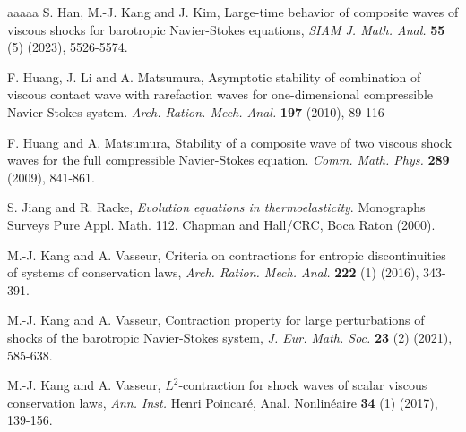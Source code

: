 \documentclass[10pt,reqno]{amsart}
\numberwithin{equation}{section}
\begin{document}
\begin{thebibliography}{aaaaa}
 S. Han, M.-J. Kang and J. Kim, Large-time behavior of composite waves of viscous shocks for barotropic Navier-Stokes equations, {\it SIAM J. Math. Anal.} {\bf  55} (5) (2023), 5526-5574.







 F. Huang, J. Li  and A. Matsumura, Asymptotic stability of combination of viscous contact wave with rarefaction waves for one-dimensional compressible Navier-Stokes system. {\it Arch. Ration. Mech. Anal.} {\bf 197 } (2010), 89-116

 F. Huang and A. Matsumura, Stability of a composite wave of two viscous shock waves for the full compressible Navier-Stokes equation. {\it Comm. Math. Phys.} {\bf 289} (2009), 841-861.

 S. Jiang and R. Racke, {\it Evolution equations in thermoelasticity}.  Monographs
Surveys Pure Appl. Math. 112. Chapman and Hall/CRC, Boca Raton (2000).

 M.-J. Kang and A. Vasseur, Criteria on contractions for entropic discontinuities of systems of conservation laws, {\it Arch. Ration. Mech. Anal.} {\bf 222} (1) (2016), 343-391.

 M.-J. Kang and A. Vasseur, Contraction property for large perturbations of shocks of the barotropic Navier-Stokes system, {\it J. Eur. Math. Soc.} {\bf 23} (2) (2021), 585-638.

  M.-J. Kang and A. Vasseur, $L^2$-contraction for shock waves of scalar viscous conservation laws, {\it Ann. Inst.} Henri Poincar\'{e}, Anal. Nonlin\'{e}aire {\bf 34} (1) (2017), 139-156.


\end{thebibliography}
\end{document}
